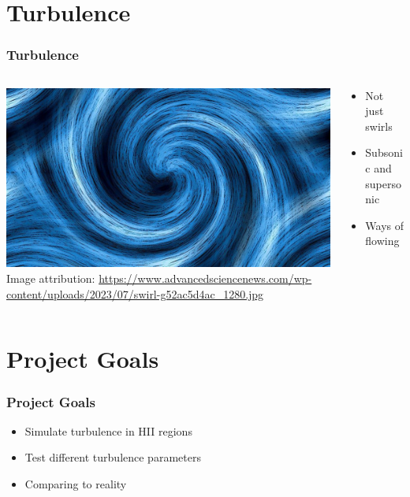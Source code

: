 \documentclass[aspectratio=169,compress]{beamer}
\newcommand\teeny{\fontsize{3pt}{3.6pt}\selectfont}
\begin{document}
\section{Turbulence}
\begin{frame}
  \frametitle{Turbulence}
  \begin{columns}
    \begin{column}{0.6\linewidth}
      \centering
      \includegraphics[width=0.8\linewidth]{figures/turbulence.jpg}\\
      {\teeny Image attribution: \url{https://www.advancedsciencenews.com/wp-content/uploads/2023/07/swirl-g52ac5d4ac_1280.jpg}}
    \end{column}
    \begin{column}{0.4\linewidth}
      \begin{itemize}
        \item Not just swirls
        \item Subsonic and supersonic
        \item Ways of flowing
      \end{itemize}
    \end{column}
  \end{columns}
\end{frame}

\section{Project Goals}
\begin{frame}
  \frametitle{Project Goals}
  \begin{itemize}
    \item Simulate turbulence in HII regions
    \item Test different turbulence parameters
    \item Comparing to reality
  \end{itemize}
\end{frame}
\end{document}
